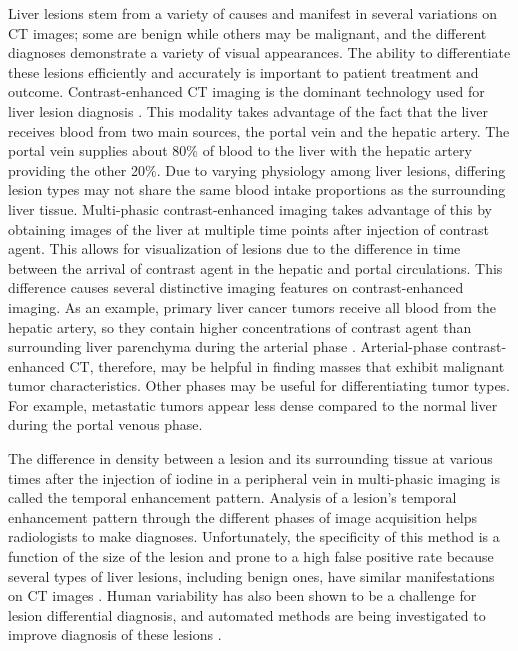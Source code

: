 Liver lesions stem from a variety of causes and manifest in several variations on CT images; some are benign while others may be malignant, and the different diagnoses demonstrate a variety of visual appearances. The ability to differentiate these lesions efficiently and accurately is important to patient treatment and outcome. Contrast-enhanced CT imaging is the dominant technology used for liver lesion diagnosis \cite{Baron:1994vg}. This modality takes advantage of the fact that the liver receives blood from two main sources, the portal vein and the hepatic artery. The portal vein supplies about 80\% of blood to the liver with the hepatic artery providing the other 20\%. Due to varying physiology among liver lesions, differing lesion types may not share the same blood intake proportions as the surrounding liver tissue. Multi-phasic contrast-enhanced imaging takes advantage of this by obtaining images of the liver at multiple time points after injection of contrast agent. This allows for visualization of lesions due to the difference in time between the arrival of contrast agent in the hepatic and portal circulations. This difference causes several distinctive imaging features on contrast-enhanced imaging. As an example, primary liver cancer tumors receive all blood from the hepatic artery, so they contain higher concentrations of contrast agent than surrounding liver parenchyma during the arterial phase \cite{Lautt:1987wm, Matsui:1991vb}. Arterial-phase contrast-enhanced CT, therefore, may be helpful in finding masses that exhibit malignant tumor characteristics. Other phases may be useful for differentiating tumor types. For example, metastatic tumors appear less dense compared to the normal liver during the portal venous phase.

The difference in density between a lesion and its surrounding tissue at various times after the injection of iodine in a peripheral vein in multi-phasic imaging is called the temporal enhancement pattern. Analysis of a lesion's temporal enhancement pattern through the different phases of image acquisition helps radiologists to make diagnoses. Unfortunately, the specificity of this method is a function of the size of the lesion and prone to a high false positive rate because several types of liver lesions, including benign ones, have similar manifestations on CT images \cite{Lencioni:2005ia}. Human variability has also been shown to be a challenge for lesion differential diagnosis, and automated methods are being investigated to improve diagnosis of these lesions \cite{ArmatoIII:2007ks}. 
